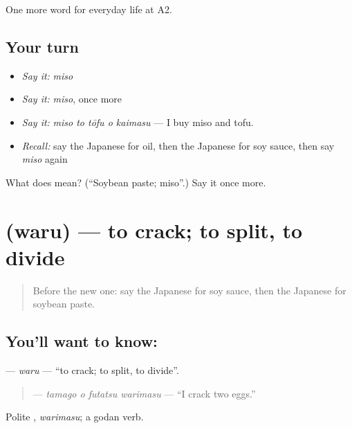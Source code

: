 \begin{grammarlens}[title={What you've built}]
One more word for everyday life at A2.
\end{grammarlens}

\subsection*{Your turn}
\begin{itemize}
\raggedright
  \item \emph{Say it:} \emph{miso}
  \item \emph{Say it:} \emph{miso}, once more
  \item \emph{Say it:} \emph{miso to tōfu o kaimasu} — I buy miso and tofu.
  \item \emph{Recall:} say the Japanese for oil, then the Japanese for soy sauce, then say \emph{miso} again
\end{itemize}

\begin{tcolorbox}[breakable,colback=teal!4,colframe=teal!35!black,title={Before you move on}]
What does  mean? (\textquotedblleft{}Soybean paste; miso\textquotedblright{}.) Say it once more.
\end{tcolorbox}
\section[\texorpdfstring{\ja{わる} (waru)}{わる (waru)}]{ (waru) — to crack; to split, to divide}

\label{lesson:JA-C176-waru}



\begin{quote}
Before the new one: say the Japanese for soy sauce, then the Japanese for soybean paste.
\end{quote}

\subsection*{You'll want to know: }
\textbf{} — \emph{waru} — \textquotedblleft{}to crack; to split, to divide\textquotedblright{}.

\begin{quote}
\textbf{  } — \emph{tamago o futatsu warimasu} — \textquotedblleft{}I crack two eggs.\textquotedblright{}
\end{quote}

Polite \textbf{}, \emph{warimasu}; a godan verb.

